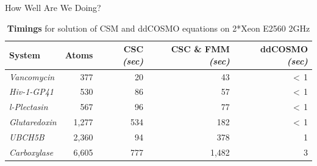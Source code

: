 \begin{frame}{How Well Are We Doing?}
{{\footnotesize
\begin{center}
\begin{table}
	\begin{tabular}{ lrrrr  }
\toprule[0.1em] 
{\bf System}	& {\bf Atoms}	& {\bf CSC} {\sl(sec)} & {\bf CSC \& FMM} {\sl(sec)} & {\bf ddCOSMO} {\sl(sec)} \\
\midrule[0.08em]
{\sl Vancomycin}	& 377	& 20  	& 43 		&  \cellcolor{YellowGreen} $<\,$1 \\
{\sl Hiv-1-GP41} 	& 530	& 86		& 57 		& \cellcolor{YellowGreen}$<\,$1 \\
{\sl l-Plectasin} 		& 567	& 96		& 77		& \cellcolor{YellowGreen}$<\,$1 \\
{\sl Glutaredoxin} 	& 1,277 	& 534 	& 182 	& \cellcolor{YellowGreen}$<\,$1 \\
{\sl UBCH5B}		& 2,360 	& 94		& 378 	& \cellcolor{YellowGreen}1 \\
{\sl Carboxylase} 	& 6,605	& 777 	& 1,482	& \cellcolor{YellowGreen}3 \\
\bottomrule[0.1em]
	\end{tabular}
		\caption{\scriptsize {\bf Timings} for solution of CSM and ddCOSMO equations on 2*Xeon E2560 2GHz}
		\end{table}
\end{center}
}

}


\end{frame}


